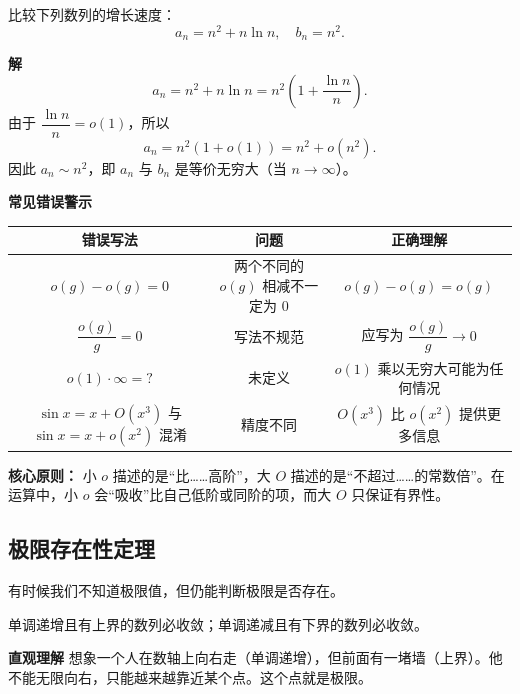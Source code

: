 \documentclass{ctexart}
\newenvironment{custom}[1]{\par\noindent \textbf{#1}\quad}{\par\vspace{1em}}
\begin{document}
\begin{example}[利用 o 和 O 比较数列增长]
比较下列数列的增长速度：
\[
a_n = n^2 + n \ln n,\quad b_n = n^2.
\]

\begin{custom}{解}
\[
a_n = n^2 + n \ln n = n^2 \left(1 + \dfrac{\ln n}{n}\right).
\]
由于 \(\dfrac{\ln n}{n} = o(1)\)，所以
\[
a_n = n^2 (1 + o(1)) = n^2 + o(n^2).
\]
因此 \(a_n \sim n^2\)，即 \(a_n\) 与 \(b_n\) 是等价无穷大（当 \(n \to \infty\)）。
\end{custom}
\end{example}

\begin{custom}{常见错误警示}

\begin{tabular}{|c|c|c|}
\hline
\textbf{错误写法} & \textbf{问题} & \textbf{正确理解} \\
\hline
\(o(g) - o(g) = 0\) & 两个不同的 \(o(g)\) 相减不一定为 0 & \(o(g) - o(g) = o(g)\) \\
\hline
\(\dfrac{o(g)}{g} = 0\) & 写法不规范 & 应写为 \(\dfrac{o(g)}{g} \to 0\) \\
\hline
\(o(1) \cdot \infty = ?\) & 未定义 & \(o(1)\) 乘以无穷大可能为任何情况 \\
\hline
\(\sin x = x + O(x^3)\) 与 \(\sin x = x + o(x^2)\) 混淆 & 精度不同 & \(O(x^3)\) 比 \(o(x^2)\) 提供更多信息 \\
\hline
\end{tabular}

\textbf{核心原则：} 小 \(o\) 描述的是“比……高阶”，大 \(O\) 描述的是“不超过……的常数倍”。在运算中，小 \(o\) 会“吸收”比自己低阶或同阶的项，而大 \(O\) 只保证有界性。
\end{custom}

\subsection{极限存在性定理}

有时候我们不知道极限值，但仍能判断极限是否存在。

\begin{theorem}[单调有界准则]
单调递增且有上界的数列必收敛；单调递减且有下界的数列必收敛。
\end{theorem}

\begin{custom}{直观理解}
想象一个人在数轴上向右走（单调递增），但前面有一堵墙（上界）。他不能无限向右，只能越来越靠近某个点。这个点就是极限。
\end{custom}
\end{document}
